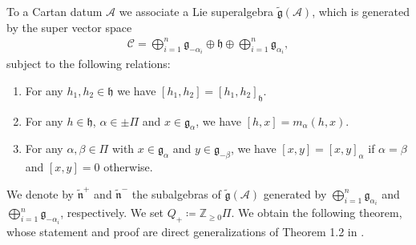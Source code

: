 \documentclass[12pt, a4paper, reqno]{amsart}
\theoremstyle{definition}
\theoremstyle{definition}
\theoremstyle{definition}
\numberwithin{theorem}{section}
\numberwithin{lemma}{section}
\numberwithin{remark}{section}
\numberwithin{definition}{section}
\numberwithin{corollary}{section}
\numberwithin{proposition}{section}
\numberwithin{example}{section}
\begin{document}
	To a Cartan datum \(\mathcal{A}\) we associate a Lie superalgebra \(\tilde{\mathfrak{g}}(\mathcal{A})\), which is generated by the super vector space
	\begin{align}\label{generating-set}	\mathcal{C} = \bigoplus_{i=1}^n \mathfrak{g}_{-\alpha_i} \oplus \mathfrak{h} \oplus \bigoplus_{i=1}^n \mathfrak{g}_{\alpha_i},
	\end{align}
	subject to the following relations:
	\begin{enumerate}
		\item For any \(h_1,h_2 \in \mathfrak{h}\) we have \([h_1,h_2] = [h_1,h_2]_{\mathfrak{h}}\).
		\item For any \(h \in \mathfrak{h}\), \(\alpha \in \pm\Pi\) and \(x \in \mathfrak{g}_{\alpha}\), we have \([h,x] = m_{\alpha}(h,x)\).
		\item For any \(\alpha,\beta \in \Pi\) with \(x \in \mathfrak{g}_{\alpha}\) and \(y \in \mathfrak{g}_{-\beta}\), we have \([x,y] = [x,y]_{\alpha}\) if \(\alpha = \beta\) and \([x,y] = 0\) otherwise.
	\end{enumerate}
	We denote by \(\tilde{\mathfrak{n}}^+\) and \(\tilde{\mathfrak{n}}^-\) the subalgebras of \(\tilde{\mathfrak{g}}(\mathcal{A})\) generated by \(\bigoplus_{i=1}^n \mathfrak{g}_{\alpha_i}\) and \(\bigoplus_{i=1}^n \mathfrak{g}_{-\alpha_i}\), respectively. We set \(Q_+ \coloneq \mathbb{Z}_{\geq 0} \Pi\). We obtain the following theorem, whose statement and proof are direct generalizations of Theorem 1.2 in \cite{K}.
\end{document}
